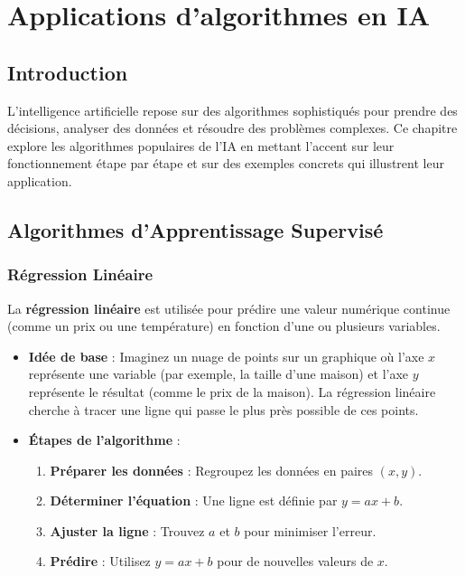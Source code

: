 \chapter{Applications d'algorithmes en IA}

\section{Introduction}
L'intelligence artificielle repose sur des algorithmes sophistiqués pour prendre des décisions, analyser des données et résoudre des problèmes complexes. Ce chapitre explore les algorithmes populaires de l'IA en mettant l’accent sur leur fonctionnement étape par étape et sur des exemples concrets qui illustrent leur application.

\section{Algorithmes d'Apprentissage Supervisé}

\subsection{Régression Linéaire}
La \textbf{régression linéaire} est utilisée pour prédire une valeur numérique continue (comme un prix ou une température) en fonction d'une ou plusieurs variables.

\begin{itemize}
	\item \textbf{Idée de base} : Imaginez un nuage de points sur un graphique où l'axe $x$ représente une variable (par exemple, la taille d’une maison) et l'axe $y$ représente le résultat (comme le prix de la maison). La régression linéaire cherche à tracer une ligne qui passe le plus près possible de ces points.
	\item \textbf{Étapes de l’algorithme} :
	\begin{enumerate}
		\item \textbf{Préparer les données} : Regroupez les données en paires $(x, y)$.
		\item \textbf{Déterminer l’équation} : Une ligne est définie par $y = ax + b$.
		\item \textbf{Ajuster la ligne} : Trouvez $a$ et $b$ pour minimiser l’erreur.
		\item \textbf{Prédire} : Utilisez $y = ax + b$ pour de nouvelles valeurs de $x$.
	\end{enumerate}
\end{itemize}

